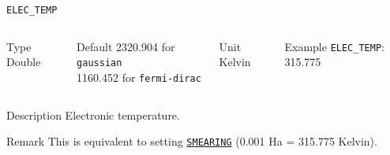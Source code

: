 \begin{frame}[allowframebreaks]{\texttt{ELEC\_TEMP}} \label{ELEC_TEMP}
\vspace*{-12pt}
\begin{columns}
\begin{block}{Type}
Double
\end{block}

\begin{block}{Default}
2320.904 for \texttt{gaussian} \\
1160.452 for \texttt{fermi-dirac}
\end{block}

\begin{block}{Unit}
Kelvin
\end{block}

\begin{block}{Example}
\texttt{ELEC\_TEMP}: 315.775
\end{block}
\end{columns}

\begin{block}{Description}
Electronic temperature. 
\end{block}

\begin{block}{Remark}
This is equivalent to setting \hyperlink{SMEARING}{\texttt{SMEARING}} (0.001 Ha = 315.775 Kelvin).
\end{block}

\end{frame}



